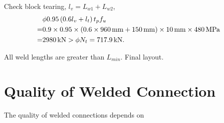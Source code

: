 \begin{solution}
\begin{enumerate}
Check block tearing, $l_v=L_{w1}+L_{w2}$,
\begin{align*}
&\phi0.95\left(0.6l_{v}+l_{t}\right)t_pf_u\\
=&0.9\times0.95\times\left(0.6\times\SI{960}{\milli\meter}+\SI{150}{\milli\meter}\right)\times\SI{10}{\milli\meter}\times\SI{480}{\mega\pascal}\\
=&\SI{2980}{\kilo\newton}>\phi{}N_t=\SI{717.9}{\kilo\newton}.
\end{align*}

All weld lengths are greater than $L_{min}$. Final layout.
\begin{figure}[H]
\centering

\end{figure}
\end{enumerate}
\end{solution}
\section{Quality of Welded Connection}
The quality of welded connections depends on
